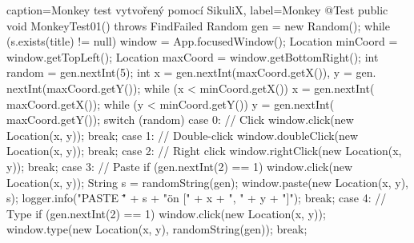 \begin{lstjava}{caption={Monkey test vytvořený pomocí SikuliX}, label={Monkey}}
@Test
public void MonkeyTest01() throws FindFailed {
  Random gen = new Random();
  while (s.exists(title) != null) {
    window = App.focusedWindow();
    Location minCoord = window.getTopLeft();
    Location maxCoord = window.getBottomRight();
    int random = gen.nextInt(5);
    int x = gen.nextInt(maxCoord.getX()), y = gen.
      nextInt(maxCoord.getY());
    while (x < minCoord.getX()) x = gen.nextInt(
      maxCoord.getX());
    while (y < minCoord.getY()) y = gen.nextInt(
      maxCoord.getY());
    switch (random) {
      case 0: // Click
        window.click(new Location(x, y));
        break;
      case 1: // Double-click
        window.doubleClick(new Location(x, y));
        break;
      case 2: // Right click
        window.rightClick(new Location(x, y));
        break;
      case 3: // Paste
        if (gen.nextInt(2) == 1) window.click(new
          Location(x, y));
        String s = randomString(gen);
        window.paste(new Location(x, y), s);
        logger.info("PASTE \"" + s + "\" on [" + x +
          ", " + y + "]");
        break;
      case 4: // Type
        if (gen.nextInt(2) == 1) window.click(new
          Location(x, y));
        window.type(new Location(x, y),
          randomString(gen));
        break;
    }
  }
}
\end{lstjava}